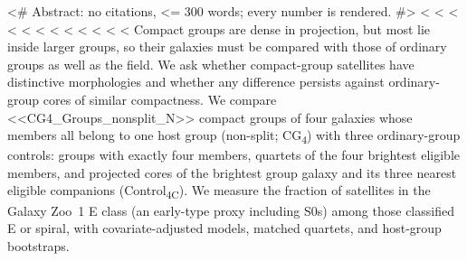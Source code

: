 \documentclass{aa}
\newcommand{\CC}{Control\textsubscript{4C}}
\newcommand{\CG}{CG\textsubscript{4}}
\begin{document}
  \date{Received ...; accepted ...}

<# Abstract: no citations, <= 300 words; every number is rendered. #>
<%
<%
<%
<%
<%
<%
<%
<%
<%
<%
<%
<%
  \abstract
  {Compact groups are dense in projection, but most lie inside larger groups, so their galaxies must be compared with those of ordinary groups as well as the field.}
  {We ask whether compact-group satellites have distinctive morphologies and whether any difference persists against ordinary-group cores of similar compactness.}
  {We compare <<CG4_Groups_nonsplit_N>> compact groups of four galaxies whose members all belong to one host group (non-split; \CG) with three ordinary-group controls: groups with exactly four members, quartets of the four brightest eligible members, and projected cores of the brightest group galaxy and its three nearest eligible companions (\CC). We measure the fraction of satellites in the Galaxy Zoo~1 E class (an early-type proxy including S0s) among those classified E or spiral, with covariate-adjusted models, matched quartets, and host-group bootstraps.}
\end{document}
